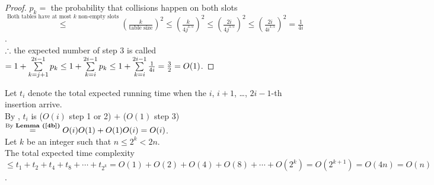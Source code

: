 \begin{pr}
\begin{lm}
\begin{proof}
$p_k=$ the probability that collisions happen on both slots $\overset{\text{Both tables have at most }k\text{ non-empty slots}}\leq(\frac k{\text{table size}})^2\leq(\frac k{4j^{1.5}})^2\leq(\frac{2i}{4j^{1.5}})^2\leq(\frac{2i}{4i^{1.5}})^2=\frac1{4i}$.\\
$\therefore$ the expected number of step 3 is called $=1+\sum\limits_{k=j+1}^{2i-1}p_k\leq1+\sum\limits_{k=i}^{2i-1}p_k\leq1+\sum\limits_{k=i}^{2i-1}\frac1{4i}=\frac32=O(1)$.
\end{proof}
\end{lm}
Let $t_i$ denote the total expected running time when the $i$, $i+1$, \dots, $2i-1$-th insertion arrive.\\
By , $t_i$ is ($O(i)$ step 1 or 2) $+$ ($O(1)$ step 3) $\overtext{By \rflm{4b}}=O(i)O(1)+O(1)O(i)=O(i)$.\\
Let $k$ be an integer such that $n\leq2^k<2n$.\\
The total expected time complexity $\leq t_1+t_2+t_4+t_8+\cdots+t_{2^k}=O(1)+O(2)+O(4)+O(8)+\cdots+O(2^k)=O(2^{k+1})=O(4n)=O(n)$.
\end{pr}

